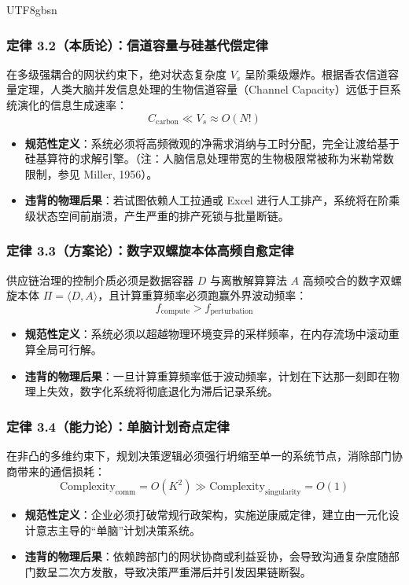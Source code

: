 \documentclass[11pt,a4paper]{article}
\begin{document}
\begin{CJK*}{UTF8}{gbsn}
\subsubsection{定律 3.2（本质论）：信道容量与硅基代偿定律}
在多级强耦合的网状约束下，绝对状态复杂度 $V_s$ 呈阶乘级爆炸。根据香农信道容量定理，人类大脑并发信息处理的生物信道容量（Channel Capacity）远低于巨系统演化的信息生成速率：
$$C_{\text{carbon}} \ll V_s \approx O(N!)$$
\begin{itemize}
    \item \textbf{规范性定义}：系统必须将高频微观的净需求消纳与工时分配，完全让渡给基于硅基算符的求解引擎。（注：人脑信息处理带宽的生物极限常被称为米勒常数限制，参见 Miller, 1956）。
    \item \textbf{违背的物理后果}：若试图依赖人工拉通或 Excel 进行人工排产，系统将在阶乘级状态空间前崩溃，产生严重的排产死锁与批量断链。
\end{itemize}

\subsubsection{定律 3.3（方案论）：数字双螺旋本体高频自愈定律}
供应链治理的控制介质必须是数据容器 $D$ 与离散解算算法 $A$ 高频咬合的数字双螺旋本体 $\Pi = \langle D, A \rangle$，且计算重算频率必须跑赢外界波动频率：
$$f_{\text{compute}} > f_{\text{perturbation}}$$
\begin{itemize}
    \item \textbf{规范性定义}：系统必须以超越物理环境变异的采样频率，在内存流场中滚动重算全局可行解。
    \item \textbf{违背的物理后果}：一旦计算重算频率低于波动频率，计划在下达那一刻即在物理上失效，数字化系统将彻底退化为滞后记录系统。
\end{itemize}

\subsubsection{定律 3.4（能力论）：单脑计划奇点定律}
在非凸的多维约束下，规划决策逻辑必须强行坍缩至单一的系统节点，消除部门协商带来的通信损耗：
$$\text{Complexity}_{\text{comm}} = O(K^2) \gg \text{Complexity}_{\text{singularity}} = O(1)$$
\begin{itemize}
    \item \textbf{规范性定义}：企业必须打破常规行政架构，实施逆康威定律，建立由一元化设计意志主导的“单脑”计划决策系统。
    \item \textbf{违背的物理后果}：依赖跨部门的网状协商或利益妥协，会导致沟通复杂度随部门数呈二次方发散，导致决策严重滞后并引发因果链断裂。
\end{itemize}


\end{CJK*}
\end{document}
